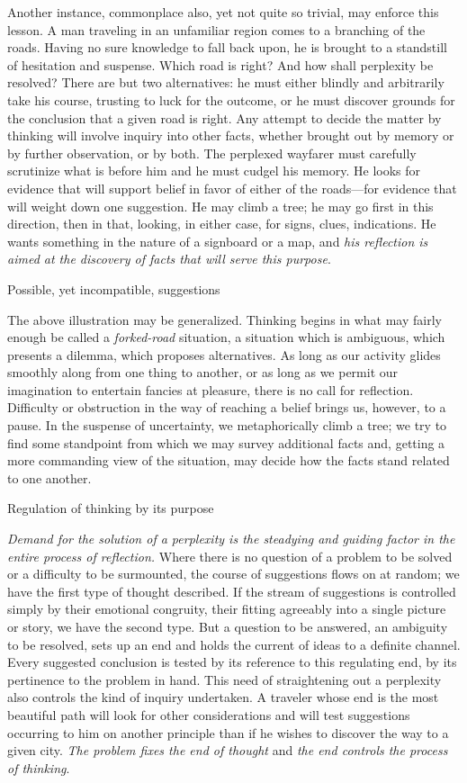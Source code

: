 \documentclass[letterpaper]{book}
\begin{document}
Another instance, commonplace also, yet not quite so trivial, may
enforce this lesson. A man traveling in an unfamiliar region comes to a
branching of the roads. Having no sure knowledge to fall back upon, he
is brought to a standstill of hesitation and suspense. Which road is
right? And how shall perplexity be resolved? There are but two
alternatives: he must either blindly and arbitrarily take his course,
trusting to luck for the outcome, or he must discover grounds for the
conclusion that a given road is right. Any attempt to decide the matter
by thinking will involve inquiry into other facts, whether brought out
by memory or by further observation, or by both. The perplexed wayfarer
must carefully scrutinize what is before him and he must cudgel his
memory. He looks for evidence that will support belief in favor of
either of the roads---for evidence that will weight down one suggestion.
He may climb a tree; he may go first in this direction, then in that,
looking, in either case, for signs,
clues,
indications. He wants something in the nature of a signboard or a map,
and \emph{his reflection is aimed at the discovery of facts that will
serve this purpose}.

Possible, yet incompatible, suggestions

The above illustration may be generalized. Thinking begins in what may
fairly enough be called a \emph{forked-road} situation, a situation
which is ambiguous, which presents a dilemma, which proposes
alternatives. As long as our activity glides smoothly along from one
thing to another, or as long as we permit our imagination to entertain
fancies at pleasure, there is no call for reflection. Difficulty or
obstruction in the way of reaching a belief brings us, however, to a
pause. In the suspense of uncertainty, we metaphorically climb a tree;
we try to find some standpoint from which we may survey additional facts
and, getting a more commanding view of the situation, may decide how the
facts stand related to one another.

Regulation of thinking by its purpose

\emph{Demand for the solution of a perplexity is the steadying and
guiding factor in the entire process of reflection.} Where there is no
question of a problem to be solved or a difficulty to be surmounted, the
course of suggestions flows on at random; we have the first type of
thought described. If the stream of suggestions is controlled simply by
their emotional congruity, their fitting agreeably into a single picture
or story, we have the second type. But a question to be answered, an
ambiguity to be resolved, sets up an end and holds the current of ideas
to a definite channel. Every suggested conclusion is tested by its
reference to this regulating end, by its pertinence to the problem in
hand. This need of straightening out a perplexity also controls the kind
of inquiry undertaken. A traveler whose end is the most beautiful path
will look for other considerations
and
will test suggestions occurring to him on another principle than if he
wishes to discover the way to a given city. \emph{The problem fixes the
end of thought} and \emph{the end controls the process of thinking}.
\end{document}
